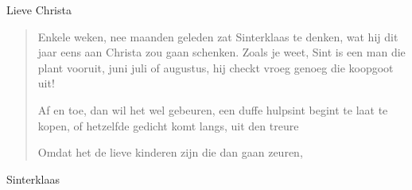 \documentclass[12pt]{brief}
\date{9 december 2006}
\begin{document}
\begin{letter}{Lieve Christa}

\opening{}


\begin{verse}

Enkele weken, nee maanden geleden zat Sinterklaas te denken,
wat hij dit jaar eens aan Christa zou gaan schenken.
Zoals je weet, Sint is een man die plant vooruit,
juni juli of augustus, hij checkt vroeg genoeg die koopgoot uit!

Af en toe, dan wil het wel gebeuren,
een duffe hulpsint begint te laat te kopen,
of hetzelfde gedicht komt langs, uit den treure


Omdat het de lieve kinderen zijn die dan gaan zeuren,



\end{verse}


Sinterklaas


\closing{}

\end{letter}
\end{document}
